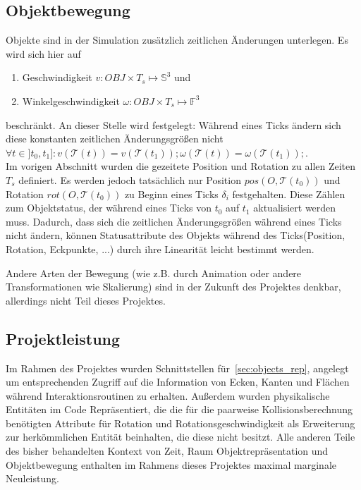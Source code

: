 \subsection{Objektbewegung}
Objekte sind in der Simulation zusätzlich zeitlichen Änderungen unterlegen. Es wird sich hier auf
\begin{enumerate}
\item Geschwindigkeit $v: OBJ \times T_s \mapsto \mathbb{S}^3$  und
\item Winkelgeschwindigkeit $\omega : OBJ \times T_s \mapsto \mathbb{F}^3 $
\end{enumerate}
beschränkt.
An dieser Stelle wird festgelegt: Während eines Ticks ändern sich diese konstanten zeitlichen Änderungsgrößen nicht $\forall t \in ]t_0, t_1] : v(\mathcal{T}(t)) = v(\mathcal{T}( t_1 )); \omega(\mathcal{T}(t)) = \omega(\mathcal{T}(t_1));$.\\
Im vorigen Abschnitt wurden die gezeitete Position und Rotation zu allen Zeiten $T_s$ definiert.
Es werden jedoch tatsächlich nur Position $pos(O, \mathcal{T}(t_0))$ und Rotation $rot(O, \mathcal{T}(t_0))$ zu Beginn eines Ticks $\delta_i$ festgehalten. Diese Zählen zum Objektstatus, der während eines Ticks von $t_0$ auf $t_1$ aktualisiert werden muss. Dadurch, dass sich die zeitlichen Änderungsgrößen während eines Ticks nicht ändern, können Statusattribute des Objekts während des Ticks(Position, Rotation, Eckpunkte, ...) durch ihre Linearität leicht bestimmt werden.  

Andere Arten der Bewegung (wie z.B. durch Animation oder andere Transformationen wie Skalierung) sind in der Zukunft des Projektes denkbar, allerdings nicht Teil dieses Projektes.

\subsection{Projektleistung}
Im Rahmen des Projektes wurden Schnittstellen für~\ref{sec:objects_rep}, angelegt um entsprechenden Zugriff auf die Information von Ecken, Kanten und Flächen während Interaktionsroutinen zu erhalten. Außerdem wurden physikalische Entitäten im Code Repräsentiert, die die für die paarweise Kollisionsberechnung benötigten Attribute für Rotation und Rotationsgeschwindigkeit als Erweiterung zur herkömmlichen Entität beinhalten, die diese nicht besitzt. Alle anderen Teile des bisher behandelten Kontext von Zeit, Raum Objektrepräsentation und Objektbewegung enthalten im Rahmens dieses Projektes maximal marginale Neuleistung.


